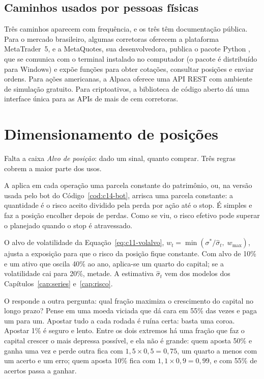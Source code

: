 \subsection{Caminhos usados por pessoas físicas}

Três caminhos aparecem com frequência, e os três têm documentação pública. Para o mercado brasileiro, algumas corretoras oferecem a plataforma MetaTrader~5, e a MetaQuotes, sua desenvolvedora, publica o pacote Python , que se comunica com o terminal instalado no computador (o pacote é distribuído para Windows) e expõe funções para obter cotações, consultar posições e enviar ordens. Para ações americanas, a Alpaca oferece uma API REST com ambiente de simulação gratuito. Para criptoativos, a biblioteca de código aberto  dá uma interface única para as APIs de mais de cem corretoras.


\section{Dimensionamento de posições}
\label{sec:c14-dimensionamento}

Falta a caixa \emph{Alvo de posição}: dado um sinal, quanto comprar. Três regras cobrem a maior parte dos usos.

A  aplica em cada operação uma parcela constante do patrimônio, ou, na versão usada pelo bot do Código~\ref{cod:c14-bot}, arrisca uma parcela constante: a quantidade é o risco aceito dividido pela perda por ação até o stop. É simples e faz a posição encolher depois de perdas. Como se viu, o risco efetivo pode superar o planejado quando o stop é atravessado.

O alvo de volatilidade da Equação~\eqref{eq:c11-volalvo}, $w_t = \min(\sigma^{*}/\hat\sigma_t,\; w_{\max})$, ajusta a exposição para que o risco da posição fique constante. Com alvo de 10\% e um ativo que oscila 40\% ao ano, aplica-se um quarto do capital; se a volatilidade cai para 20\%, metade. A estimativa $\hat\sigma_t$ vem dos modelos dos Capítulos~\ref{cap:series} e~\ref{cap:risco}.

O  responde a outra pergunta: qual fração maximiza o crescimento do capital no longo prazo? Pense em uma moeda viciada que dá cara em 55\% das vezes e paga um para um. Apostar tudo a cada rodada é ruína certa: basta uma coroa. Apostar 1\% é seguro e lento. Entre os dois extremos há uma fração que faz o capital crescer o mais depressa possível, e ela não é grande: quem aposta 50\% e ganha uma vez e perde outra fica com $1,5 \times 0,5 = 0,75$, um quarto a menos com um acerto e um erro; quem aposta 10\% fica com $1,1 \times 0,9 = 0,99$, e com 55\% de acertos passa a ganhar.

